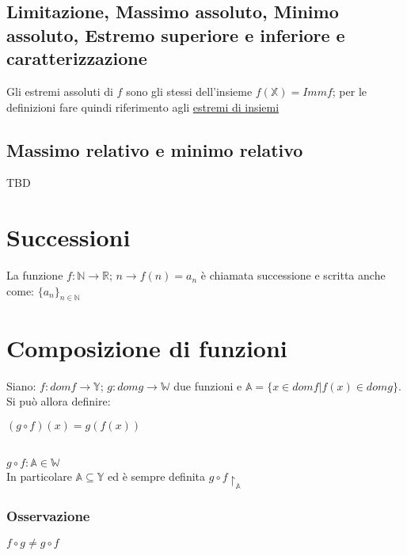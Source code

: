 \subsection{Limitazione, Massimo assoluto, Minimo assoluto, Estremo superiore e inferiore e caratterizzazione}
Gli estremi assoluti di $f$ sono gli stessi dell'insieme $f(\mathbb{X}) = Immf$; per le definizioni fare quindi riferimento agli \hyperref[sec: estremiInsiemi]{estremi di insiemi}
\subsection{Massimo relativo e minimo relativo}
TBD
\section{Successioni}
La funzione $f: \mathbb{N} \rightarrow \mathbb{R}$;  $n \rightarrow f(n) = a_n$ è chiamata successione e scritta anche come: $\{a_n\}_{n \in \mathbb{N}}$

\section{Composizione di funzioni}
Siano: $f: domf \rightarrow \mathbb{Y}$; $g: domg \rightarrow \mathbb{W}$ due funzioni e $\mathbb{A}=\{x \in domf | f(x) \in domg\}$. Si può allora definire:\\
\begin{Large}
$(g \circ f)(x) = g(f(x))$
\end{Large}\\
$g \circ f: \mathbb{A} \in \mathbb{W}$\\
In particolare $\mathbb{A} \subseteq \mathbb{Y}$ ed è sempre definita $g \circ f \restriction _\mathbb{A}$
\subsubsection{Osservazione}
$f \circ g \neq g \circ f$


